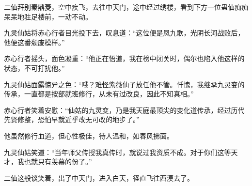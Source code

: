 \begin{this_body}
二仙拜别秦鼎菱，空中疾飞，去往中天门，途中经过绣楼，看到下方一位蛊仙痴痴呆呆地驻足楼前，一动不动。

九灵仙姑将赤心行者目光投下去，叹息道：“这位便是凤九歌，光阴长河战败后，他便这番颓废模样。”

赤心行者摇头，面色凝重：“他正在悟道，我在榜中闭关时，偶尔也陷入他这样的状态，不可打扰他。”

九灵仙姑面露惊异之色：“哦？难怪紫薇仙子放任他不管。忏愧，我继承九灵变的传承，一直都是按部就班修行，从未有过改良，因此不知真相。”

赤心行者笑着安慰：“仙姑的九灵变，乃是我天庭最顶尖的变化道传承，经过历代先贤修整，恐怕早就近乎改无可改的地步了。”

他虽然修行血道，但心性极佳，待人温和，如春风拂面。

九灵仙姑笑道：“当年师父传授我真传时，就说过我资质不成。对于你们这等天才，我也就只有羡慕的份了。”

二仙这般谈笑着，出了中天门，进入白天，径直飞往西漠去了。

\end{this_body}

